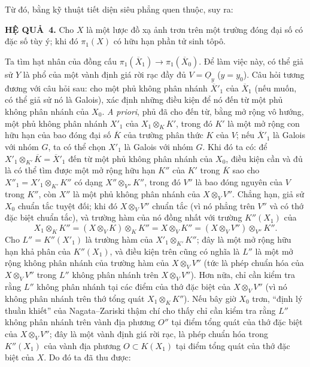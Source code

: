 \documentclass[11pt,twoside,openany]{book}
\numberwithin{equation}{section}
\newcommand{\Osh}{\underline{O}}
\newcommand{\result}[2]{\par\medskip\noindent\textbf{#1\if\relax\detokenize{#2}\relax\else\ #2\fi.}\quad}
\begin{document}
Từ đó, bằng kỹ thuật tiết diện siêu phẳng quen thuộc, suy ra:

\result{HỆ QUẢ}{4} Cho $X$ là một lược đồ xạ ảnh trơn trên một trường đóng đại
số có đặc số tùy ý; khi đó $\pi_1(X)$ có hữu hạn phần tử sinh tôpô.

Ta tìm hạt nhân của đồng cấu
$\pi_1(\overline X_1)\longrightarrow\pi_1(\overline X_0)$. Để làm việc này,
có thể giả sử $Y$ là phổ của một vành định giá rời rạc đầy đủ
$V=\Osh_y$ ($y=y_0$). Câu hỏi tương đương với câu hỏi sau: cho một phủ không
phân nhánh $\overline X'_1$ của $\overline X_1$ (nếu muốn, có thể giả sử nó là
Galois), xác định những điều kiện để nó đến từ một phủ không phân nhánh của
$X_0$. \textit{A priori}, phủ đã cho đến từ, bằng mở rộng vô hướng, một phủ
không phân nhánh $X'_1$ của $X_1\otimes_K K'$, trong đó $K'$ là một mở rộng
con hữu hạn của bao đóng đại số $\overline K$ của trường phân thức $K$ của
$V$; nếu $\overline X'_1$ là Galois với nhóm $G$, ta có thể chọn $X'_1$ là
Galois với nhóm $G$. Khi đó ta có: để
$X'_1\otimes_{K'}\overline K=\overline X'_1$ đến từ một phủ không phân nhánh
của $X_0$, điều kiện cần và đủ là có thể tìm được một mở rộng hữu hạn $K''$
của $K'$ trong $\overline K$ sao cho
$X''_1=X'_1\otimes_{K'}K''$ có dạng $X''\otimes_{V''}K''$, trong đó $V''$ là
bao đóng nguyên của $V$ trong $K''$, còn $X''$ là một phủ không phân nhánh của
$X\otimes_VV''$. Chẳng hạn, giả sử $X_0$ chuẩn tắc tuyệt đối; khi đó
$X\otimes_VV''$ chuẩn tắc (vì nó phẳng trên $V''$ và có thớ đặc biệt chuẩn
tắc), và trường hàm của nó đồng nhất với trường $K''(X_1)$ của
\[
  X_1\otimes_KK''
  =(X\otimes_VK)\otimes_KK''
  =X\otimes_VK''
  =(X\otimes_VV'')\otimes_{V''}K''.
\]
Cho $L''=K''(X'_1)$ là trường hàm của
$X'_1\otimes_{K'}K''$; đây là một mở rộng hữu hạn khả phân của $K''(X_1)$, và
điều kiện trên cũng có nghĩa là $L''$ là một mở rộng không phân nhánh của
trường hàm của $X\otimes_VV''$ (tức là phép chuẩn hóa của
$X\otimes_VV''$ trong $L''$ không phân nhánh trên $X\otimes_VV''$). Hơn nữa,
chỉ cần kiểm tra rằng $L''$ không phân nhánh tại các điểm của thớ đặc biệt của
$X\otimes_VV''$ (vì nó không phân nhánh trên thớ tổng quát
$X_1\otimes_KK''$). Nếu bây giờ $X_0$ trơn, “định lý thuần khiết” của
Nagata--Zariski thậm chí cho thấy chỉ cần kiểm tra rằng $L''$ không phân nhánh
trên vành địa phương $O''$ tại điểm tổng quát của thớ đặc biệt của
$X\otimes_VV''$; đây là một vành định giá rời rạc, là phép chuẩn hóa trong
$K''(X_1)$ của vành địa phương $O\subset K(X_1)$ tại điểm tổng quát của thớ
đặc biệt của $X$. Do đó ta đã thu được:
\end{document}
